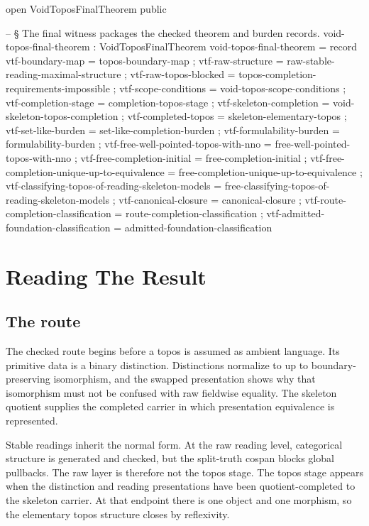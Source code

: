 \documentclass[11pt]{article}
\begin{document}
\begin{code}
open VoidToposFinalTheorem public

-- § The final witness packages the checked theorem and burden records.
void-topos-final-theorem : VoidToposFinalTheorem
void-topos-final-theorem = record
  { vtf-boundary-map        = topos-boundary-map
  ; vtf-raw-structure       = raw-stable-reading-maximal-structure
  ; vtf-raw-topos-blocked   = topos-completion-requirements-impossible
  ; vtf-scope-conditions    = void-topos-scope-conditions
  ; vtf-completion-stage    = completion-topos-stage
  ; vtf-skeleton-completion = void-skeleton-topos-completion
  ; vtf-completed-topos     = skeleton-elementary-topos
  ; vtf-set-like-burden     = set-like-completion-burden
  ; vtf-formulability-burden = formulability-burden
  ; vtf-free-well-pointed-topos-with-nno = free-well-pointed-topos-with-nno
  ; vtf-free-completion-initial = free-completion-initial
  ; vtf-free-completion-unique-up-to-equivalence =
      free-completion-unique-up-to-equivalence
  ; vtf-classifying-topos-of-reading-skeleton-models =
      free-classifying-topos-of-reading-skeleton-models
  ; vtf-canonical-closure   = canonical-closure
  ; vtf-route-completion-classification = route-completion-classification
  ; vtf-admitted-foundation-classification = admitted-foundation-classification
  }
\end{code}

\section{Reading The Result}

\subsection*{The route}

The checked route begins before a topos is assumed as ambient language.
Its primitive data is a binary distinction.  Distinctions normalize to
 up to boundary-preserving isomorphism, and the swapped
presentation shows why that isomorphism must not be confused with raw
fieldwise equality.  The skeleton quotient supplies the completed
carrier in which presentation equivalence is represented.

Stable readings inherit the normal form.  At the raw reading level,
categorical structure is generated and checked, but the split-truth
cospan blocks global pullbacks.  The raw layer is therefore not the
topos stage.  The topos stage appears when the distinction and reading
presentations have been quotient-completed to the skeleton carrier.  At
that endpoint there is one object and one morphism, so the elementary
topos structure closes by reflexivity.
\end{document}
